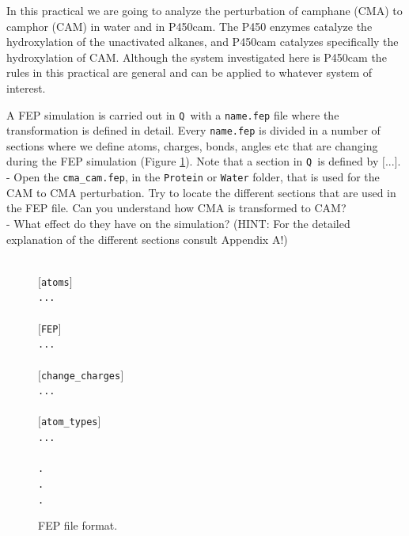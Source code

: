 \documentclass[a4paper,12pt]{article}
\newcommand{\q}{\texttt{Q}}
\begin{document}
In this practical we are going to analyze the perturbation of
camphane (CMA) to camphor (CAM) in water and in P450cam. The P450
enzymes catalyze the hydroxylation of the unactivated alkanes, and
P450cam catalyzes specifically the hydroxylation of CAM. Although
the system investigated here is P450cam the rules in this
practical are general and can be applied to whatever system of
interest.

A FEP simulation is carried out in \q\ with a \texttt{name.fep}
file where the transformation is defined in detail. Every
\texttt{name.fep} is divided in a number of sections where we
define atoms, charges, bonds, angles etc that are changing during
the FEP simulation (Figure \ref{fig:fepfile}). Note that a section
in \q\ is defined by $[$...$]$.\\

- Open the \texttt{cma\_cam.fep}, in the \texttt{Protein} or
\texttt{Water} folder, that is used for the CAM to CMA
perturbation. Try to locate the different sections that are used
in the FEP file. Can you understand how CMA is transformed to CAM?\\

- What effect do they have on the simulation? (HINT: For the detailed explanation
of the different sections consult Appendix A!)\\


\begin{figure}[ht]
\texttt{
\\
$[$atoms$]$\\
...\\
\\
$[$FEP$]$\\
...\\
\\
$[$change\_charges$]$\\
...\\
\\
$[$atom\_types$]$\\
...\\
\\
.\\
.\\
.\\
}
\caption{\label{fig:fepfile}FEP file format.}
\end{figure}
\end{document}
